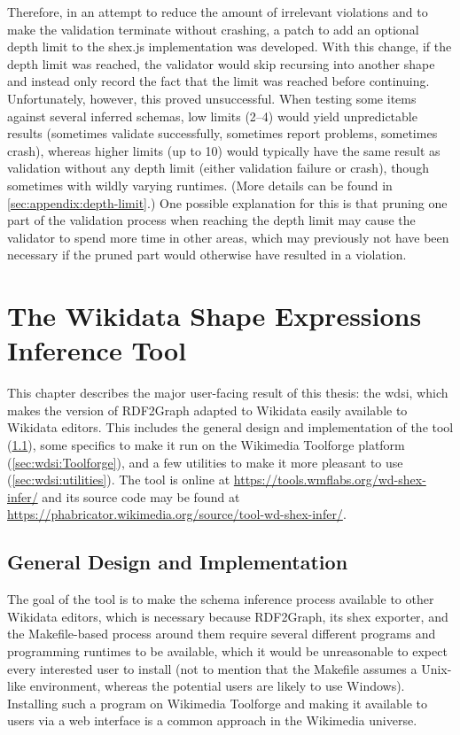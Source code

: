 Therefore, in an attempt to reduce the amount of irrelevant violations
and to make the validation terminate without crashing,
a patch to add an optional depth limit to the shex.js implementation was developed.
With this change, if the depth limit was reached,
the validator would skip recursing into another \gls{shape}
and instead only record the fact that the limit was reached before continuing.
Unfortunately, however, this proved unsuccessful.
When testing some \glspl{item} against several inferred \glspl{schema},
low limits (2–4) would yield unpredictable results
(sometimes validate successfully, sometimes report problems, sometimes crash),
whereas higher limits (up to 10) would typically have the same result as validation without any depth limit
(either validation failure or crash),
though sometimes with wildly varying runtimes.
(More details can be found in \cref{sec:appendix:depth-limit}.)
One possible explanation for this is that pruning one part of the validation process when reaching the depth limit
may cause the validator to spend more time in other areas,
which may previously not have been necessary if the pruned part would otherwise have resulted in a violation.

\chapter{The Wikidata Shape Expressions Inference Tool}
\label{ch:wdsi}

This chapter describes the major user-facing result of this thesis:
the \gls{wdsi},
which makes the version of \gls{RDF2Graph} adapted to \gls{Wikidata}
easily available to \gls{Wikidata} editors.
This includes the general design and implementation of the tool (\cref{sec:wdsi:abstract}),
some specifics to make it run on the \gls{Wikimedia Toolforge} platform (\cref{sec:wdsi:Toolforge}),
and a few utilities to make it more pleasant to use (\cref{sec:wdsi:utilities}).
The tool is online at \url{https://tools.wmflabs.org/wd-shex-infer/}
and its source code may be found at \url{https://phabricator.wikimedia.org/source/tool-wd-shex-infer/}.

\section{General Design and Implementation}
\label{sec:wdsi:abstract}

The goal of the tool is to make the \gls{schema} inference process available to other \gls{Wikidata} editors,
which is necessary because \gls{RDF2Graph}, its \gls{shex} exporter, and the Makefile-based process around them
require several different programs and programming runtimes to be available,
which it would be unreasonable to expect every interested user to install
(not to mention that the Makefile assumes a Unix-like environment,
whereas the potential users are likely to use Windows).
Installing such a program on \gls{Wikimedia Toolforge}
and making it available to users via a web interface
is a common approach in the \gls{Wikimedia} universe.

